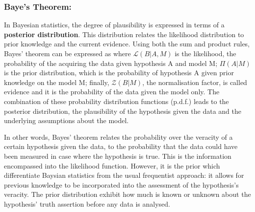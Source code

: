 \subsubsection{Baye's Theorem:}
\qquad In Bayesian statistics, the degree of plausibility is expressed in terms of a \textbf{posterior distribution}. This distribution relates the likelihood distribution to prior knowledge and the current evidence. Using both the sum and product rules, Bayes' theorem can be expressed as
where $\mathcal{L}(B|A, M)$ is the likelihood, the probability of the acquiring the data given hypothesis A and model M; $\Pi(A|M)$ is the prior distribution, which is the probability of hypothesis A given prior knowledge on the model M; finally, $\mathcal{Z}(B|M)$, the normalisation factor, is called evidence and it is the probability of the data given the model only. The combination of these probability distribution functions (p.d.f.) leads to the posterior distribution, the plausibility of the hypothesis given the data and the underlying assumptions about the model. 

\qquad In other words, Bayes' theorem relates the probability over the veracity of a certain hypothesis given the data, to the probability that the data could have been measured in case where the hypothesis is true. This is the information encompassed into the likelihood function. However, it is the prior which differentiate Baysian statistics from the usual frequentist approach: it allows for previous knowledge to be incorporated into the assessment of the hypothesis's veracity. The prior distribution exhibit how much is known or unknown about the hypothesis' truth assertion before any data is analysed. 

